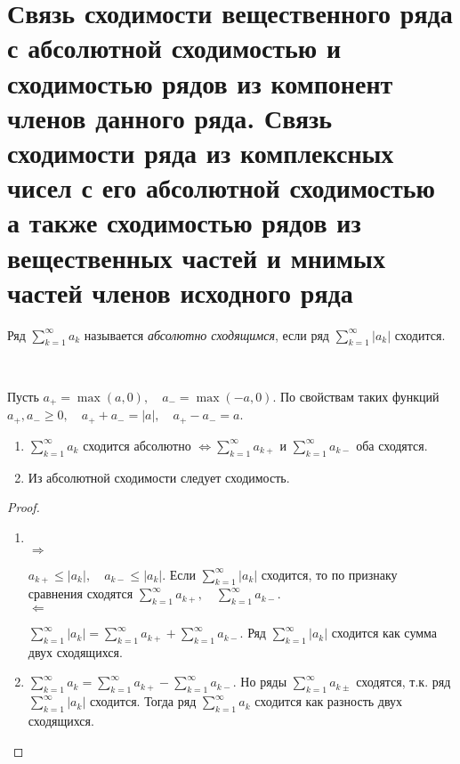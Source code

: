 \documentclass[../main.tex]{subfiles}
\begin{document}
\newpage
\section{Связь сходимости вещественного ряда с абсолютной сходимостью и сходимостью рядов из компонент членов данного ряда. Связь сходимости ряда из комплексных чисел с его абсолютной сходимостью а также сходимостью рядов из вещественных частей и мнимых частей членов исходного ряда}

Ряд \( \sum\limits_{ k=1}^{ \infty } a_k\) называется \emph{абсолютно сходящимся}, если ряд \( \sum\limits_{ k=1}^{ \infty } \left| a_k\right|\) сходится.

\begin{thm}
    
    ~

    Пусть \( a_+= \max\limits_{ } \left( a,0\right),\quad a_-= \max\limits_{ } \left( -a, 0\right)\). По свойствам таких функций \( a_+, a_- \geq 0,\quad a_++a_-=\left| a\right|,\quad a_+-a_-=a\).

    \begin{enumerate}
        \item \( \sum\limits_{ k=1}^{ \infty } a_k\) сходится абсолютно \( \Longleftrightarrow \sum\limits_{ k=1}^{ \infty } a_{k+}\) и \( \sum\limits_{ k=1}^{ \infty } a_{k-}\) оба сходятся.
        \item Из абсолютной сходимости следует сходимость. 
    \end{enumerate}
\end{thm}
\begin{proof}
    
    ~

    \begin{enumerate}
        \item ~\\ \(\boxed{\Longrightarrow}\)\par 
        \( a_{k+} \leq \left| a_{k}\right|,\quad a_{k-} \leq \left| a_k\right|\). Если \( \sum\limits_{ k=1}^{ \infty } \left| a_k\right|\) сходится, то по признаку сравнения сходятся \( \sum\limits_{ k=1}^{ \infty } a_{k+},\quad \sum\limits_{ k=1}^{ \infty } a_{k-}\).
        ~\\ \( \boxed{\Longleftarrow}\) \par 
        \( \sum\limits_{ k=1}^{ \infty } \left| a_k\right|= \sum\limits_{ k=1}^{ \infty } a_{k+}+ \sum\limits_{ k=1}^{ \infty } a_{k-}\). Ряд \( \sum\limits_{ k=1}^{ \infty } \left| a_k\right|\) сходится как сумма двух сходящихся. 
        \item\quad\quad 
        \par \( \sum\limits_{ k=1}^{ \infty } a_k= \sum\limits_{ k=1}^{ \infty } a_{k+}- \sum\limits_{ k=1}^{ \infty } a_{k-}\). Но ряды \( \sum\limits_{ k=1}^{ \infty } a_{k\pm}\) сходятся, т.к. ряд \( \sum\limits_{ k=1}^{ \infty } \left| a_k\right|\) сходится. Тогда ряд \( \sum\limits_{ k=1}^{ \infty } a_k\) сходится как разность двух сходящихся.
    \end{enumerate}
\end{proof}
\end{document}
